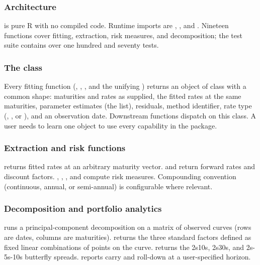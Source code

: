 \subsubsection{Architecture}\label{architecture}

 is pure R with no compiled code. Runtime imports
are , , and . Nineteen functions
cover fitting, extraction, risk measures, and decomposition; the test
suite contains over one hundred and seventy tests.

\subsubsection{\texorpdfstring{The 
class}{The  class}}\label{the-class}

Every fitting function (, ,
, and the unifying ) returns an
object of class  with a common shape: maturities and
rates as supplied, the fitted rates at the same maturities, parameter
estimates (the  list), residuals, method identifier, rate
type (, , or ), and an
observation date. Downstream functions dispatch on this class. A user
needs to learn one object to use every capability in the package.

\subsubsection{Extraction and risk
functions}\label{extraction-and-risk-functions}

 returns fitted rates at an arbitrary maturity
vector.  and  return forward
rates and discount factors. ,
, , and
 compute risk measures. Compounding
convention (continuous, annual, or semi-annual) is configurable where
relevant.

\subsubsection{Decomposition and portfolio
analytics}\label{decomposition-and-portfolio-analytics}

 runs a principal-component decomposition on a matrix of
observed curves (rows are dates, columns are maturities).
 returns the three standard factors
defined as fixed linear combinations of points on the curve.
 returns the 2s10s, 2s30s, and 2s-5s-10s butterfly
spreads.  reports carry and roll-down at a
user-specified horizon.

